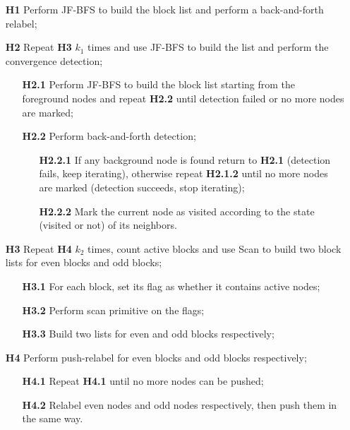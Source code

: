 {
\small
\begin{enumerate}
\item[\textbf{H1}] Perform JF-BFS to build the block list and perform a back-and-forth relabel;
\item[\textbf{H2}] Repeat \textbf{H3} $k_1$ times and use JF-BFS to build the list and perform the convergence detection;
    \begin{enumerate}
    \item[\textbf{H2.1}] Perform JF-BFS to build the block list starting from the foreground nodes and repeat \textbf{H2.2} until detection failed or no more nodes are marked;
    \item[\textbf{H2.2}] Perform back-and-forth detection;
        \begin{enumerate}
        \item[\textbf{H2.2.1}] If any background node is found return to \textbf{H2.1} (detection fails, keep iterating), otherwise repeat \textbf{H2.1.2} until no more nodes are marked (detection succeeds, stop iterating);
        \item[\textbf{H2.2.2}] Mark the current node as visited according to the state (visited or not) of its neighbors.
        \end{enumerate}
    \end{enumerate}
\item[\textbf{H3}] Repeat \textbf{H4} $k_2$ times, count active blocks and use Scan to build two block lists for even blocks and odd blocks;
    \begin{enumerate}
    \item[\textbf{H3.1}] For each block, set its flag as whether it contains active nodes;
    \item[\textbf{H3.2}] Perform scan primitive on the flags;
    \item[\textbf{H3.3}] Build two lists for even and odd blocks respectively;
    \end{enumerate}
\item[\textbf{H4}] Perform push-relabel for even blocks and odd blocks respectively;
    \begin{enumerate}
    \item[\textbf{H4.1}] Repeat \textbf{H4.1} until no more nodes can be pushed;
    \item[\textbf{H4.2}] Relabel even nodes and odd nodes respectively, then push them in the same way.
    \end{enumerate}
\end{enumerate}
}

